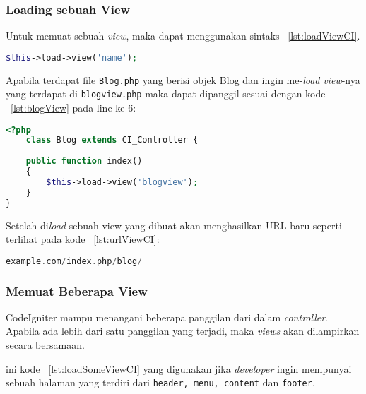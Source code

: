 \subsubsection{Loading sebuah View}
\label{ss:loadViewCI}
Untuk memuat sebuah \textit{view}, maka dapat menggunakan sintaks  ~\ref{lst:loadViewCI}.

\begin{lstlisting}[style=customphp, language=PHP, basicstyle=\ttfamily, frame=single, columns=fullflexible, keepspaces=true, breaklines=true, showstringspaces=false, label={lst:loadViewCI}, caption=Sintaks load view pada CodeIgniter.] 
$this->load->view('name');
\end{lstlisting}

Apabila terdapat file \texttt{Blog.php} yang berisi objek Blog  dan ingin me-\textit{load} \textit{view}-nya yang terdapat di \texttt{blogview.php} maka dapat dipanggil sesuai dengan kode ~\ref{lst:blogView} pada line ke-6:
\begin{lstlisting}[style=customphp, language=PHP, basicstyle=\ttfamily, frame=single, columns=fullflexible, keepspaces=true, breaklines=true, showstringspaces=false, label={lst:blogView}, caption=Contoh load view pada CodeIgniter.] 
<?php
	class Blog extends CI_Controller {
	
	public function index()
	{
		$this->load->view('blogview');
	}
}
\end{lstlisting}

\noindent Setelah di\textit{load} sebuah view yang dibuat akan menghasilkan URL baru seperti terlihat pada kode ~\ref{lst:urlViewCI}:
\begin{lstlisting}[style=customphp, language=PHP, basicstyle=\ttfamily, frame=single, columns=fullflexible, keepspaces=true, breaklines=true, showstringspaces=false, label={lst:urlViewCI}, caption=Contoh load view pada CodeIgniter.] 
example.com/index.php/blog/
\end{lstlisting}

\subsubsection{Memuat Beberapa View}
\label{ss:beberapaViewCI}
CodeIgniter mampu menangani beberapa panggilan dari dalam \textit{controller}. Apabila ada lebih dari satu panggilan yang terjadi, maka \textit{views} akan dilampirkan secara bersamaan.



\noindentBerikut ini kode ~\ref{lst:loadSomeViewCI} yang digunakan jika \textit{developer} ingin mempunyai sebuah halaman yang terdiri dari \texttt{header, menu, content} dan \texttt{footer}. 


